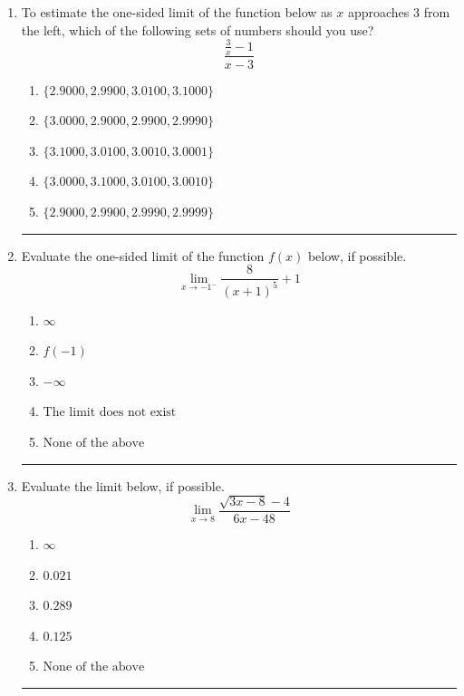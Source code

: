 \documentclass[14pt]{extbook}
\newcommand{\litem}[1]{\item#1\hspace*{-1cm}\rule{\textwidth}{0.4pt}}
\begin{document}
\begin{enumerate}
{\begin{enumerate}[label=\Alph*.]
\end{enumerate} }
\litem{
To estimate the one-sided limit of the function below as $x$ approaches 3 from the left, which of the following sets of numbers should you use?\[ \frac{\frac{3}{x} - 1}{x - 3} \]\begin{enumerate}[label=\Alph*.]
\item \( \{ 2.9000, 2.9900, 3.0100, 3.1000 \} \)
\item \( \{ 3.0000, 2.9000, 2.9900, 2.9990 \} \)
\item \( \{ 3.1000, 3.0100, 3.0010, 3.0001 \} \)
\item \( \{ 3.0000, 3.1000, 3.0100, 3.0010 \} \)
\item \( \{ 2.9000, 2.9900, 2.9990, 2.9999 \} \)

\end{enumerate} }
\litem{
Evaluate the one-sided limit of the function $f(x)$ below, if possible.\[ \lim_{x \rightarrow -1^-} \frac{8}{(x+1)^5}+1 \]\begin{enumerate}[label=\Alph*.]
\item \( \infty \)
\item \( f(-1) \)
\item \( -\infty \)
\item \( \text{The limit does not exist} \)
\item \( \text{None of the above} \)

\end{enumerate} }
\litem{
Evaluate the limit below, if possible.\[ \lim_{x \rightarrow 8} \frac{\sqrt{3x - 8} - 4}{6x - 48} \]\begin{enumerate}[label=\Alph*.]
\item \( \infty \)
\item \( 0.021 \)
\item \( 0.289 \)
\item \( 0.125 \)
\item \( \text{None of the above} \)


\end{enumerate}}
\end{enumerate}
\end{document}
